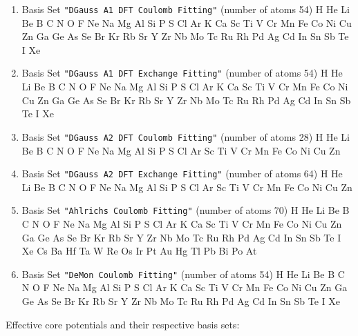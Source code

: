 \begin{enumerate}

\item Basis Set \verb#"DGauss A1 DFT Coulomb Fitting"# (number of atoms 54)  \newline
  H He Li Be B C N O F Ne Na Mg Al Si P S Cl Ar K Ca Sc Ti V Cr Mn
 Fe Co Ni Cu Zn Ga Ge As Se Br Kr Rb Sr Y Zr Nb Mo Tc Ru Rh Pd Ag Cd In Sn
 Sb Te I Xe


\item Basis Set \verb#"DGauss A1 DFT Exchange Fitting"# (number of atoms 54)  \newline
  H He Li Be B C N O F Ne Na Mg Al Si P S Cl Ar K Ca Sc Ti V Cr Mn
 Fe Co Ni Cu Zn Ga Ge As Se Br Kr Rb Sr Y Zr Nb Mo Tc Ru Rh Pd Ag Cd In Sn
 Sb Te I Xe

\item Basis Set \verb#"DGauss A2 DFT Coulomb Fitting"# (number of atoms 28)  \newline
  H He Li Be B C N O F Ne Na Mg Al Si P S Cl Ar Sc Ti V Cr Mn Fe Co
 Ni Cu Zn


\item Basis Set \verb#"DGauss A2 DFT Exchange Fitting"# (number of atoms 64)  \newline
  H He Li Be B C N O F Ne Na Mg Al Si P S Cl Ar Sc Ti V Cr Mn Fe Co
 Ni Cu Zn

\item Basis Set \verb#"Ahlrichs Coulomb Fitting"# (number of atoms 70)  \newline
  H He Li Be B C N O F Ne Na Mg Al Si P S Cl Ar K Ca Sc Ti V Cr Mn
 Fe Co Ni Cu Zn Ga Ge As Se Br Kr Rb Sr Y Zr Nb Mo Tc Ru Rh Pd Ag Cd In Sn
 Sb Te I Xe Cs Ba Hf Ta W Re Os Ir Pt Au Hg Tl Pb Bi Po At

\item Basis Set \verb#"DeMon Coulomb Fitting"# (number of atoms 54)  \newline
  H He Li Be B C N O F Ne Na Mg Al Si P S Cl Ar K Ca Sc Ti V Cr Mn
 Fe Co Ni Cu Zn Ga Ge As Se Br Kr Rb Sr Y Zr Nb Mo Tc Ru Rh Pd Ag Cd In Sn
 Sb Te I Xe


\end{enumerate}

Effective core potentials and their respective basis sets:

